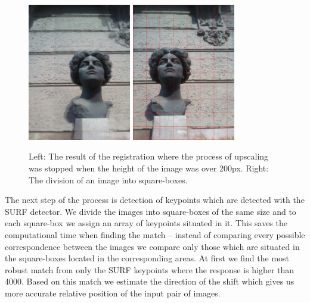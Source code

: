 \begin{figure}[h]
\centerline{
\includegraphics[width=4.5cm]{img/ema_overlap.png}
\includegraphics[width=4.5cm]{img/ema_buckets.png}}
\caption{Left: The result of the registration where the process of upscaling was stopped when the height of the image was over 200px. Right: The division of an image into square-boxes.}
\label{fig:overlap_and_buckets}
\end{figure}

The next step of the process is detection of keypoints which are detected with the SURF detector.
We divide the images into square-boxes of the same size and to each square-box we assign an array of keypoints situated in it.
This saves the computational time when finding the match -- instead of comparing every possible correspondence between the images we compare only those which are situated in the square-boxes located in the corresponding areas.
At first we find the most robust match from only the SURF keypoints where the response is higher than 4000.
Based on this match we estimate the direction of the shift which gives us more accurate relative position of the input pair of images.

